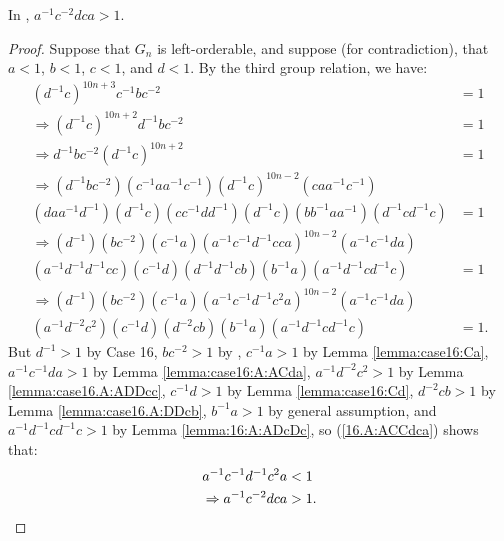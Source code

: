 \begin{lemma} In , $a^{-1}c^{-2}dca>1$.
\label{lemma:case16:A:ACCdca}
\end{lemma}
\begin{proof} Suppose that $G_n$ is left-orderable, and suppose (for contradiction), that $a<1$, $b<1$, $c<1$, and $d<1$. By the third group relation, we have: 
\begin{align}
(d^{-1}c)^{10n+3}c^{-1}bc^{-2}&=1\nonumber{}\\
\Rightarrow{}(d^{-1}c)^{10n+2}d^{-1}bc^{-2}&=1\nonumber{}\\
\Rightarrow{}d^{-1}bc^{-2}(d^{-1}c)^{10n+2}&=1\nonumber{}\\
\Rightarrow{}(d^{-1}bc^{-2})(c^{-1}aa^{-1}c^{-1})(d^{-1}c)^{10n-2}(caa^{-1}c^{-1})&\nonumber{}\\
(daa^{-1}d^{-1})(d^{-1}c)(cc^{-1}dd^{-1})(d^{-1}c)(bb^{-1}aa^{-1})(d^{-1}cd^{-1}c)&=1\nonumber{}\\
\Rightarrow{}(d^{-1})(bc^{-2})(c^{-1}a)(a^{-1}c^{-1}d^{-1}cca)^{10n-2}(a^{-1}c^{-1}da)&\nonumber{}\\
(a^{-1}d^{-1}d^{-1}cc)(c^{-1}d)(d^{-1}d^{-1}cb)(b^{-1}a)(a^{-1}d^{-1}cd^{-1}c)&=1\nonumber{}\\
\Rightarrow{}(d^{-1})(bc^{-2})(c^{-1}a)(a^{-1}c^{-1}d^{-1}c^{2}a)^{10n-2}(a^{-1}c^{-1}da)&\nonumber{}\\
(a^{-1}d^{-2}c^{2})(c^{-1}d)(d^{-2}cb)(b^{-1}a)(a^{-1}d^{-1}cd^{-1}c)&=1.
\label{16.A:ACCdca}
\end{align}
But $d^{-1}>1$ by Case 16, $bc^{-2}>1$ by , $c^{-1}a>1$ by Lemma \ref{lemma:case16:Ca}, $a^{-1}c^{-1}da>1$ by Lemma \ref{lemma:case16:A:ACda}, $a^{-1}d^{-2}c^{2}>1$ by Lemma \ref{lemma:case16.A:ADDcc}, $c^{-1}d>1$ by Lemma \ref{lemma:case16:Cd}, $d^{-2}cb>1$ by Lemma \ref{lemma:case16.A:DDcb}, $b^{-1}a>1$ by general assumption, and $a^{-1}d^{-1}cd^{-1}c>1$ by Lemma \ref{lemma:16:A:ADcDc}, so (\ref{16.A:ACCdca}) shows that:
\begin{align*}
a^{-1}c^{-1}d^{-1}c^{2}a&<1\\
\Rightarrow{}a^{-1}c^{-2}dca&>1.\qedhere
\end{align*}
\end{proof}


